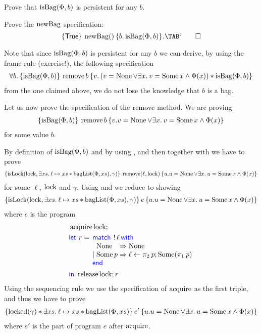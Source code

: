 \begin{example}
  \begin{exercise}
    Prove that $\operatorname{isBag}(\Phi,b)$ is persistent for any $b$.
  \end{exercise}
  

  \begin{exercise}
    Prove the $\operatorname{newBag}$ specification:
    \begin{displaymath}
      \hoare{\TRUE}{\newBag \TT}{b. \isBag(\Phi,b)}.\qedhere
    \end{displaymath}
  \end{exercise}
  

  Note that since $\operatorname{isBag}(\Phi,b)$ is persistent for any $b$ we can derive, by using the frame rule (exercise!), the following specification
  \begin{align*}
    \All b.\hoare{\isBag(\Phi,b)}{\bremove b}{v.\left(v = \None \lor \Exists x . v = \Some x \land \Phi(x)\right) \ast \isBag(\Phi,b)}
  \end{align*}
  from the one claimed above, \ie{} we do not lose the knowledge that $b$ is a bag.

  Let us now prove the specification of the $\operatorname{remove}$ method.
  We are proving
  \begin{align*}
    \hoare{\isBag(\Phi,b)}{\bremove b}{v.v = \None \lor \Exists x . v = \Some x \land \Phi(x)}
  \end{align*}
  for some value $b$.
  
  By definition of $\operatorname{isBag}(\Phi,b)$ and by using , and then  together with  we have to prove
  \begin{align*}
    \hoare{\isLock(\lock, \Exists xs . \ell \pointsto xs \ast \baglist(\Phi,xs), \gamma)}{\bremove (\ell,\lock)}{u.u = \None \lor{} \Exists x . u = \Some x \land \Phi(x)}
  \end{align*}
  for some $\ell$, $\operatorname{lock}$ and $\gamma$.
  Using  and  we reduce to showing
  \begin{align*}
    \hoare{\isLock(\lock, \Exists xs . \ell \pointsto xs \ast \baglist(\Phi,xs), \gamma)}{e}{u.u = \None \lor{} \Exists x . u = \Some x \land \Phi(x)}
  \end{align*}
  where $e$ is the program
  \begin{align*}
    &\acquire \lock ;\\
    &\langkw{let}\ r = \MatchML{\deref \ell}with{\None}=>{\None}|{\Some p}=>{\ell \gets \Proj{2}{p} ; \Some (\Proj{1}{p})}end{} \\
    & \langkw{in}\ \release \lock ; r
  \end{align*}
  Using the sequencing rule  we use the specification of $\operatorname{acquire}$ as the first triple, and thus we have to prove
  \begin{align*}
    \hoare{\locked(\gamma) \ast \Exists xs . \ell \pointsto xs \ast \baglist(\Phi,xs)}{e'}{u.u = \None \lor{} \Exists x . u = \Some x \land \Phi(x)}
  \end{align*}
  where $e'$ is the part of program $e$ after $\operatorname{acquire}$.


\end{example}
